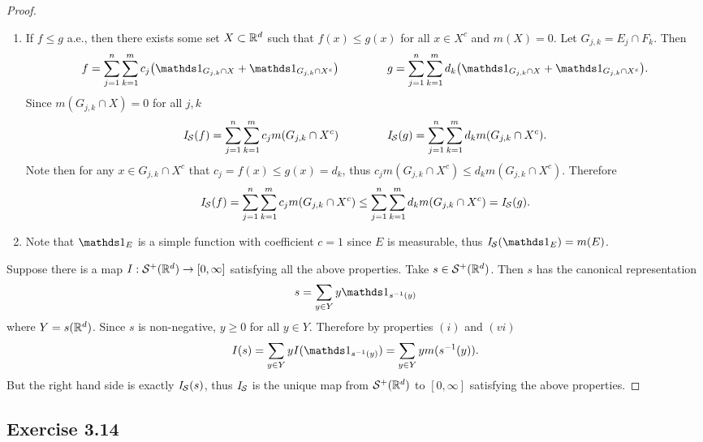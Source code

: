 \documentclass[hw_all.tex]{subfiles}
\begin{document}
\begin{proof}
\begin{enumerate}
        \item
            If $f \leq g$ a.e., then there exists some set $X \subset \mathbb{R}^d$ such that $f(x) \leq g(x)$ for all $x \in X^c$ and $m(X) = 0$. Let $G_{j,k} = E_j \cap F_k$. Then
            \[
                f = \sum_{j=1}^n \sum_{k=1}^m c_j \qty(\ind{G_{j,k} \cap X} + \ind{G_{j,k} \cap X^c}) \hspace{1.5cm} g = \sum_{j=1}^n \sum_{k=1}^m d_k \qty(\ind{G_{j,k} \cap X} + \ind{G_{j,k} \cap X^c})
            .\]
            Since $m(G_{j,k} \cap X) = 0$ for all $j,k$
            \[
                \mathit{I}_{\mathcal{S}}(f) = \sum_{j=1}^n \sum_{k=1}^m c_j m(G_{j,k} \cap X^c) \hspace{1.5cm} \mathit{I}_{\mathcal{S}}(g) = \sum_{j=1}^n \sum_{k=1}^m d_k m(G_{j,k} \cap X^c)
            .\]
            Note then for any $x \in G_{j,k} \cap X^c$ that $c_j = f(x) \leq g(x) = d_k$, thus $c_j m(G_{j,k} \cap X^c) \leq d_k m(G_{j,k} \cap X^c)$. Therefore
            \[
                \mathit{I}_{\mathcal{S}}(f) = \sum_{j=1}^n \sum_{k=1}^m c_j m(G_{j,k} \cap X^c) \leq \sum_{j=1}^n \sum_{k=1}^m d_k m(G_{j,k} \cap X^c) = \mathit{I}_{\mathcal{S}}(g)
            .\]

        \item
            Note that $\ind{E}$ is a simple function with coefficient $c = 1$ since $E$ is measurable, thus $\sint(\ind{E}) = m(E)$.

    \end{enumerate}

    Suppose there is a map $I : \mathcal{S}^+ (\mathbb{R}^d) \to [0,\infty]$ satisfying all the above properties. Take $s \in \mathcal{S}^+ (\mathbb{R}^d)$. Then $s$ has the canonical representation
    \[
        s = \sum_{y \in Y} y \ind{s^{-1}(y)}
    \]
    where $Y = s(\mathbb{R}^d)$. Since $s$ is non-negative, $y \geq 0$ for all $y \in Y$. Therefore by properties $(i)$ and $(vi)$
    \[
        I(s) = \sum_{y \in Y} y I(\ind{s^{-1}(y)}) = \sum_{y \in Y} y m(s^{-1}(y))
    .\]
    But the right hand side is exactly $\mathit{I}_{\mathcal{S}}(s)$, thus $\mathit{I}_{\mathcal{S}}$ is the unique map from $\mathcal{S}^+(\mathbb{R}^d)$ to $[0,\infty]$ satisfying the above properties.
\end{proof}

\subsection{Exercise 3.14}
\end{document}

